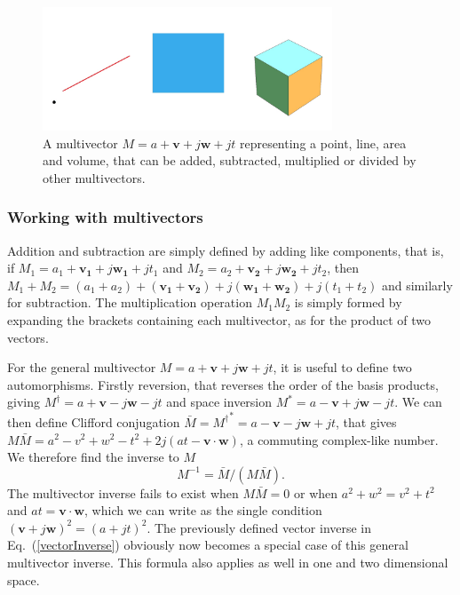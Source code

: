 \documentclass[prb,preprint]{revtex4}
\newcommand{\be}{\begin{equation}}
\newcommand{\ee}{\end{equation}}
\newcommand{\iGA}{{j}}
\newcommand{\reversion}[1] { {#1}^{\dagger} }
\newcommand{\cliffconj}[1] { \bar{#1} }
\begin{document}
\begin{figure}[htb]

\begin{center}
\includegraphics[width=3.4in]{Multi}
\end{center}

\caption{A multivector $ M = a + \boldsymbol{v} + \iGA \boldsymbol{w} + \iGA t $ representing a point, line, area and volume, that can be added, subtracted, multiplied or divided by other multivectors. \label{MultiPic}}

\end{figure}


\subsubsection{Working with multivectors}

Addition and subtraction are simply defined by adding like components, that is, if $ M_1 = a_1 + \boldsymbol{v_1} + \iGA \boldsymbol{w_1} + \iGA t_1 $ and $ M_2 = a_2 + \boldsymbol{v_2} + \iGA \boldsymbol{w_2} + \iGA t_2 $, then  $ M_1 + M_2  = (a_1+a_2)+ (\boldsymbol{v_1}+\boldsymbol{v_2})+ \iGA (\boldsymbol{w_1}+\boldsymbol{w_2}) + \iGA (t_1+t_2) $ and similarly for subtraction.
The multiplication operation $ M_1 M_2 $ is simply formed by expanding the brackets containing each multivector, as for the product of two vectors. 

For the general multivector $ M = a + \boldsymbol{v} + \iGA \boldsymbol{w} + \iGA t $, it is useful to define two automorphisms.  Firstly reversion, that reverses the order of the basis products, giving $ {\reversion{M}} = a + \boldsymbol{v} - \iGA \boldsymbol{w} - \iGA t $ and space inversion $ M^{*} =  a - \boldsymbol{v} + \iGA \boldsymbol{w} - \iGA t $.
We can then define Clifford conjugation $ \cliffconj{M} = {\reversion{M}}^{*} = a - \boldsymbol{v} - \iGA \boldsymbol{w} + \iGA t $, that gives $ M \cliffconj{M} = a^2 - v^2 + w^2 - t^2 + 2 \iGA (a t - \boldsymbol{v} \cdot \boldsymbol{w} )$, a commuting complex-like number. We therefore find the inverse to $ M $ 
\be
M^{-1} = \cliffconj{M} /(M \cliffconj{M}).
\ee
The multivector inverse  fails to exist when $ M \cliffconj{M} = 0 $ or when $ a^2  + w^2 =  v^2 + t^2 $ and $ a t = \boldsymbol{v} \cdot \boldsymbol{w} $, which we can write as the single condition $ (\boldsymbol{v} + \iGA \boldsymbol{w})^2 = (a + \iGA t )^2 $.
The previously defined vector inverse in Eq.~(\ref{vectorInverse}) obviously now becomes a special case of this general multivector inverse.  This formula also applies as well in one and two dimensional space.
\end{document}
